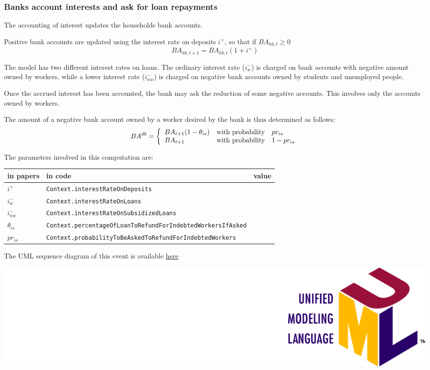 \documentclass{book}
\newcommand{\umllocation}{file:///Users/giulioni/Dropbox/svn/sfcabm_my/documentation}
\begin{document}
\subsubsection{Banks account interests and ask for loan repayments}

The accounting of interest updates the households bank accounts.

Positive bank accounts are updated using the interest rate on deposits $i^+$, so that if $BA_{hb,t}\ge 0$
\[
BA_{hb,t+1}=BA_{hb,t}(1+i^+)
\]

The model has two different interest rates on loans. The ordinary interest rate ($i^-_{w}$) is charged on bank accounts with negative amount owned by workers, while a lower interest rate ($i^-_{nw}$) is charged on negative bank accounts owned by students and unemployed people. 

Once the accrued interest has been accounted, the bank may ask the reduction of some negative accounts. This involves only the accounts owned by workers.

 
The amount of a negative bank account owned by a worker desired by the bank is thus determined as follows:
\[
	BA^{db}=\left\{ 
		\begin{array}{l l l}
			BA_{t+1}(1-\theta_{is})&\textnormal{with probability}& pr_{is}\\
			BA_{t+1}&\textnormal{with probability}& 1-pr_{is}\\
		\end{array}
		\right.
\]

The parameters involved in this computation are:

\vskip2mm
\begin{tabular}{l l l}
	\hline
	in papers& in code&value\\
	\hline
	\hline
$i^+$&\verb+Context.interestRateOnDeposits+&\\
$i^-_{w}$&\verb+Context.interestRateOnLoans+&\\
$i^-_{nw}$&\verb+Context.interestRateOnSubsidizedLoans+&\\
$\theta_{is}$&\verb+Context.percentageOfLoanToRefundForIndebtedWorkersIfAsked+&\\
$pr_{is}$&\verb+Context.probabilityToBeAskedToRefundForIndebtedWorkers+&\\
	\hline
\end{tabular}

\vskip2mm

The UML sequence diagram of this event is available \href{\umllocation/updateConsumersAccounts.html}{here}
\begin{marginfigure}
	\includegraphics[scale=0.1]{uml.png}
\end{marginfigure}
\end{document}
